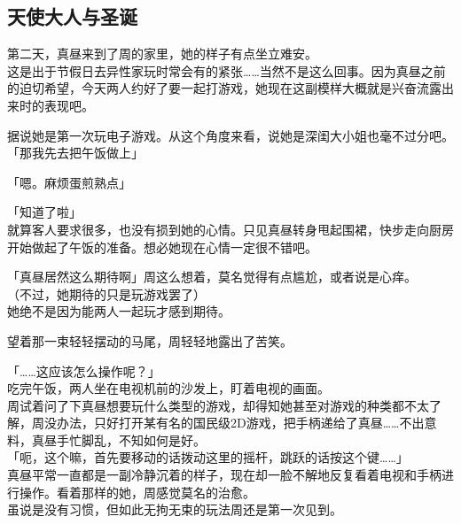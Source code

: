 \subsection{天使大人与圣诞}

第二天，真昼来到了周的家里，她的样子有点坐立难安。\\

这是出于节假日去异性家玩时常会有的紧张……当然不是这么回事。因为真昼之前的迫切希望，今天两人约好了要一起打游戏，她现在这副模样大概就是兴奋流露出来时的表现吧。

据说她是第一次玩电子游戏。从这个角度来看，说她是深闺大小姐也毫不过分吧。\\

「那我先去把午饭做上」

「嗯。麻烦蛋煎熟点」

「知道了啦」\\

就算客人要求很多，也没有损到她的心情。只见真昼转身甩起围裙，快步走向厨房开始做起了午饭的准备。想必她现在心情一定很不错吧。

「真昼居然这么期待啊」周这么想着，莫名觉得有点尴尬，或者说是心痒。\\

（不过，她期待的只是玩游戏罢了）\\

她绝不是因为能两人一起玩才感到期待。

望着那一束轻轻摆动的马尾，周轻轻地露出了苦笑。\\

\vspace{2\baselineskip}

「……这应该怎么操作呢？」\\

吃完午饭，两人坐在电视机前的沙发上，盯着电视的画面。\\

周试着问了下真昼想要玩什么类型的游戏，却得知她甚至对游戏的种类都不太了解，周没办法，只好打开某有名的国民级2D游戏，把手柄递给了真昼……不出意料，真昼手忙脚乱，不知如何是好。\\

「呃，这个嘛，首先要移动的话拨动这里的摇杆，跳跃的话按这个键……」\\

真昼平常一直都是一副冷静沉着的样子，现在却一脸不解地反复看着电视和手柄进行操作。看着那样的她，周感觉莫名的治愈。\\

虽说是没有习惯，但如此无拘无束的玩法周还是第一次见到。\\

